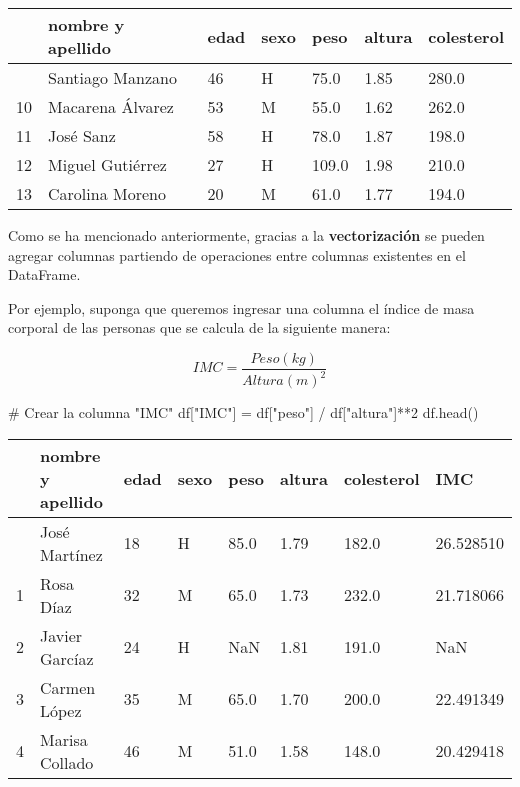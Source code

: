 \documentclass[
  letterpaper,
  DIV=11,
  numbers=noendperiod]{scrreprt}
\newenvironment{Shaded}{\begin{snugshade}}{\end{snugshade}}
\newcommand{\CommentTok}[1]{\textcolor[rgb]{0.37,0.37,0.37}{#1}}
\newcommand{\DecValTok}[1]{\textcolor[rgb]{0.68,0.00,0.00}{#1}}
\newcommand{\NormalTok}[1]{\textcolor[rgb]{0.00,0.23,0.31}{#1}}
\newcommand{\OperatorTok}[1]{\textcolor[rgb]{0.37,0.37,0.37}{#1}}
\newcommand{\StringTok}[1]{\textcolor[rgb]{0.13,0.47,0.30}{#1}}
\begin{document}
\begin{longtable}[]{@{}lllllll@{}}
\toprule\noalign{}
& nombre y apellido & edad & sexo & peso & altura & colesterol \\
\midrule\noalign{}
\endhead
\bottomrule\noalign{}
\endlastfoot
9 & Santiago Manzano & 46 & H & 75.0 & 1.85 & 280.0 \\
10 & Macarena Álvarez & 53 & M & 55.0 & 1.62 & 262.0 \\
11 & José Sanz & 58 & H & 78.0 & 1.87 & 198.0 \\
12 & Miguel Gutiérrez & 27 & H & 109.0 & 1.98 & 210.0 \\
13 & Carolina Moreno & 20 & M & 61.0 & 1.77 & 194.0 \\
\end{longtable}

\begin{tcolorbox}[enhanced jigsaw, opacityback=0, coltitle=black, toptitle=1mm, colframe=quarto-callout-tip-color-frame, leftrule=.75mm, colback=white, opacitybacktitle=0.6, toprule=.15mm, breakable, bottomrule=.15mm, rightrule=.15mm, bottomtitle=1mm, titlerule=0mm, title=\textcolor{quarto-callout-tip-color}{\faLightbulb}\hspace{0.5em}{\textbf{Agregar columnas con operaciones}}, colbacktitle=quarto-callout-tip-color!10!white, left=2mm, arc=.35mm]

Como se ha mencionado anteriormente, gracias a la \textbf{vectorización}
se pueden agregar columnas partiendo de operaciones entre columnas
existentes en el DataFrame.

\end{tcolorbox}

Por ejemplo, suponga que queremos ingresar una columna el índice de masa
corporal de las personas que se calcula de la siguiente manera:

\[
IMC = \frac{Peso(kg)}{Altura(m)^2}\]

\begin{Shaded}
\begin{Highlighting}[]
\CommentTok{\# Crear la columna "IMC"}
\NormalTok{df[}\StringTok{"IMC"}\NormalTok{] }\OperatorTok{=}\NormalTok{ df[}\StringTok{"peso"}\NormalTok{] }\OperatorTok{/}\NormalTok{ df[}\StringTok{"altura"}\NormalTok{]}\OperatorTok{**}\DecValTok{2}
\NormalTok{df.head()}
\end{Highlighting}
\end{Shaded}

\begin{longtable}[]{@{}llllllll@{}}
\toprule\noalign{}
& nombre y apellido & edad & sexo & peso & altura & colesterol & IMC \\
\midrule\noalign{}
\endhead
\bottomrule\noalign{}
\endlastfoot
0 & José Martínez & 18 & H & 85.0 & 1.79 & 182.0 & 26.528510 \\
1 & Rosa Díaz & 32 & M & 65.0 & 1.73 & 232.0 & 21.718066 \\
2 & Javier Garcíaz & 24 & H & NaN & 1.81 & 191.0 & NaN \\
3 & Carmen López & 35 & M & 65.0 & 1.70 & 200.0 & 22.491349 \\
4 & Marisa Collado & 46 & M & 51.0 & 1.58 & 148.0 & 20.429418 \\
\end{longtable}
\end{document}
